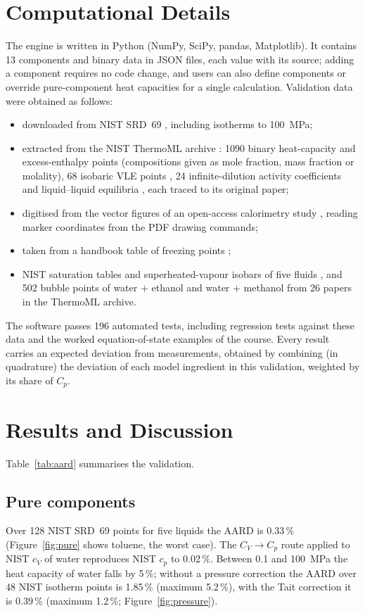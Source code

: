 \documentclass[journal=jceaax,manuscript=article,layout=twocolumn]{achemso}
\begin{document}
\section{Computational Details}
The engine is written in Python (NumPy, SciPy, pandas, Matplotlib). It contains 13 components and binary
data in JSON files, each value with its source; adding a component requires no code change, and users can
also define components or override pure-component heat capacities for a single calculation. Validation
data were obtained as follows:
\begin{itemize}
\item downloaded from NIST SRD~69 \cite{NISTFluid}, including isotherms to 100~MPa;
\item extracted from the NIST ThermoML archive \cite{ThermoMLArchive}: 1090 binary heat-capacity and excess-enthalpy points (compositions given as mole fraction, mass fraction or molality), 68 isobaric VLE points \cite{Chen2012}, 24 infinite-dilution activity coefficients \cite{Straver2005,Atik2004} and liquid--liquid equilibria \cite{Trejo2006,Casas2004}, each traced to its original paper;
\item digitised from the vector figures of an open-access calorimetry study \cite{OHanley2012}, reading marker coordinates from the PDF drawing commands;
\item taken from a handbook table of freezing points \cite{Lange1967};
\item NIST saturation tables and superheated-vapour isobars of five fluids \cite{NISTFluid}, and 502 bubble
points of water + ethanol and water + methanol from 26 papers in the ThermoML archive.
\end{itemize}
The software passes 196 automated tests, including regression tests against these data and the worked
equation-of-state examples of the course. Every result carries an expected deviation from measurements,
obtained by combining (in quadrature) the deviation of each model ingredient in this validation, weighted by
its share of $C_p$.

\section{Results and Discussion}
Table~\ref{tab:aard} summarises the validation.

\subsection{Pure components}
Over 128 NIST SRD~69 points for five liquids the AARD is 0.33\,\% (Figure~\ref{fig:pure} shows toluene,
the worst case). The $C_V\rightarrow C_p$ route applied to NIST $c_V$ of water reproduces NIST $c_p$ to 0.02\,\%.
Between 0.1 and 100~MPa the heat capacity of water falls by 5\,\%; without a pressure correction the AARD
over 48 NIST isotherm points is 1.85\,\% (maximum 5.2\,\%), with the Tait correction it is 0.39\,\%
(maximum 1.2\,\%; Figure~\ref{fig:pressure}).
\end{document}
